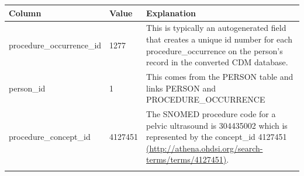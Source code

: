 \documentclass[]{book}
\begin{document}
\begin{longtable}[]{@{}lll@{}}
\toprule
\begin{minipage}[b]{0.30\columnwidth}\raggedright
Column\strut
\end{minipage} & \begin{minipage}[b]{0.14\columnwidth}\raggedright
Value\strut
\end{minipage} & \begin{minipage}[b]{0.48\columnwidth}\raggedright
Explanation\strut
\end{minipage}\tabularnewline
\midrule
\endhead
\begin{minipage}[t]{0.30\columnwidth}\raggedright
procedure\_occurrence\_id\strut
\end{minipage} & \begin{minipage}[t]{0.14\columnwidth}\raggedright
1277\strut
\end{minipage} & \begin{minipage}[t]{0.48\columnwidth}\raggedright
This is typically an autogenerated field that creates a unique id number for each procedure\_occurrence on the person's record in the converted CDM database.\strut
\end{minipage}\tabularnewline
\begin{minipage}[t]{0.30\columnwidth}\raggedright
person\_id\strut
\end{minipage} & \begin{minipage}[t]{0.14\columnwidth}\raggedright
1\strut
\end{minipage} & \begin{minipage}[t]{0.48\columnwidth}\raggedright
This comes from the PERSON table and links PERSON and PROCEDURE\_OCCURRENCE\strut
\end{minipage}\tabularnewline
\begin{minipage}[t]{0.30\columnwidth}\raggedright
procedure\_concept\_id\strut
\end{minipage} & \begin{minipage}[t]{0.14\columnwidth}\raggedright
4127451\strut
\end{minipage} & \begin{minipage}[t]{0.48\columnwidth}\raggedright
The SNOMED procedure code for a pelvic ultrasound is 304435002 which is represented by the concept\_id 4127451 \href{http://athena.ohdsi.org/search-terms/terms/4127451}{(http://athena.ohdsi.org/search-terms/terms/4127451)}.\strut
\end{minipage}\tabularnewline
\begin{minipage}[t]{0.30\columnwidth}\raggedright

\end{minipage}
\end{longtable}
\end{document}
